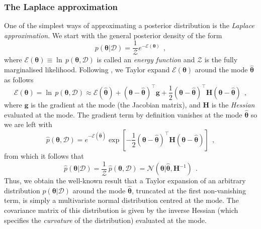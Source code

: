 \documentclass[12pt,dvipsnames]{report}
\renewcommand{\vec}[1]{\boldsymbol{\mathbf{#1}}}
\newcommand{\hquad}{~~}
\begin{document}
\subsubsection{The Laplace approximation}
One of the simplest ways of approximating a posterior distribution is the
\emph{Laplace approximation}. We start with the general posterior density of
the form
\begin{equation}
    p(\vec{\theta}\lvert\mathcal{D})=\frac{1}{\mathcal{Z}}e^{-\mathcal{E}(\vec{\theta})}
    \hquad,
\end{equation}
where $\mathcal{E}(\vec{\theta}) \equiv \ln\,p(\vec{\theta}, \mathcal{D})$
is called an \emph{energy function} and $\mathcal{Z}$ is the fully marginalised
likelihood. Following \citet{murphy_book_2022}, we Taylor expand 
$\mathcal{E}(\vec{\theta})$ around the mode $\hat{\vec{\theta}}$ as follows
\begin{equation}
    \mathcal{E}(\vec{\theta}) =\ln\,p(\vec{\theta}, \mathcal{D})\approx \mathcal{E}(\hat{\vec{\theta}})+(\vec{\theta}-\hat{\vec{\theta}})^{\intercal} \vec{g}+\frac{1}{2}(\vec{\theta}-\hat{\vec{\theta}})^{\intercal} \mathbf{H}(\vec{\theta}-\hat{\vec{\theta}})
    \hquad,
\end{equation}
where $\vec{g}$ is the gradient at the mode (the Jacobian matrix), and $\vec{H}$
is the \emph{Hessian} evaluated at the mode. The gradient term by definition
vanishes at the mode $\hat{\vec{\theta}}$ so we are left with
\begin{equation}
    \hat{p}(\vec{\theta}, \mathcal{D})=e^{-\mathcal{E}(\hat{\vec{\theta}})} \exp \left[-\frac{1}{2}(\boldsymbol{\theta}-\hat{\vec{\theta}})^{\intercal} \mathbf{H}(\vec{\theta}-\hat{\vec{\theta}})\right]
    \hquad,
\end{equation}
from which it follows that
\begin{equation}
    \hat{p}(\vec{\theta} \lvert\mathcal{D})=\frac{1}{\mathcal{Z}}\, \hat{p}(\vec{\theta}, \mathcal{D})=\mathcal{N}\left(\vec{\theta} \lvert\hat{\vec{\theta}}, \mathbf{H}^{-1}\right)
    \hquad.
\end{equation}
Thus, we obtain the well-known result that a Taylor expansion of an arbitrary
distribution  $p(\vec{\theta} \lvert\mathcal{D})$ around the mode $\hat{\vec{\theta}}$,
truncated at the first non-vanishing term, is simply a multivariate normal distribution
centred at the mode. The covariance matrix of this distribution is given by the 
inverse Hessian (which specifies the \emph{curvature} of the distribution) 
evaluated at the mode.
\end{document}

